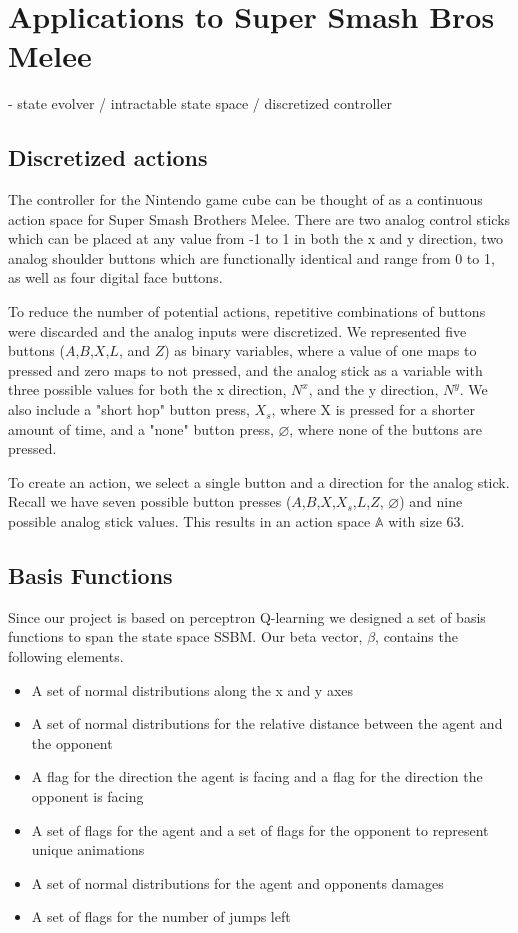 \section{Applications to Super Smash Bros Melee}
- state evolver / intractable state space / discretized controller

\subsection{Discretized actions}
The controller for the Nintendo game cube can be thought of as a continuous action space for Super Smash Brothers Melee. There are two analog control sticks which can be placed at any value from -1 to 1 in both the x and y direction, two analog shoulder buttons which are functionally identical and range from 0 to 1, as well as four digital face buttons. 

To reduce the number of potential actions, repetitive combinations of buttons were discarded and the analog inputs were discretized. We represented five buttons ($A$,$B$,$X$,$L$, and $Z$) as binary variables, where a value of one maps to pressed and zero maps to not pressed, and the analog stick as a variable with three possible values for both the x direction, $N^{x}$, and the y direction, $N^{y}$. We also include a "short hop" button press, $X_{s}$, where X is pressed for a shorter amount of time, and a "none" button press, $\varnothing$, where none of the buttons are pressed. 

To create an action, we select a single button and a direction for the analog stick. Recall we have seven possible button presses ($A$,$B$,$X$,$X_{s}$,$L$,$Z$, $\varnothing$) and nine possible analog stick values. This results in an action space $\mathbb{A}$ with size 63.


\subsection{Basis Functions}
Since our project is based on perceptron Q-learning we designed a set of basis functions to span the state space SSBM. Our beta vector, $\beta$, contains the following elements.

\begin{itemize}
\item A set of normal distributions along the x and y axes
\item A set of normal distributions for the relative distance between the agent and the opponent
\item A flag for the direction the agent is facing and a flag for the direction the opponent is facing
\item A set of flags for the agent and a set of flags for the opponent to represent unique animations
\item A set of normal distributions for the agent and opponents damages
\item A set of flags for the number of jumps left
\end{itemize}

